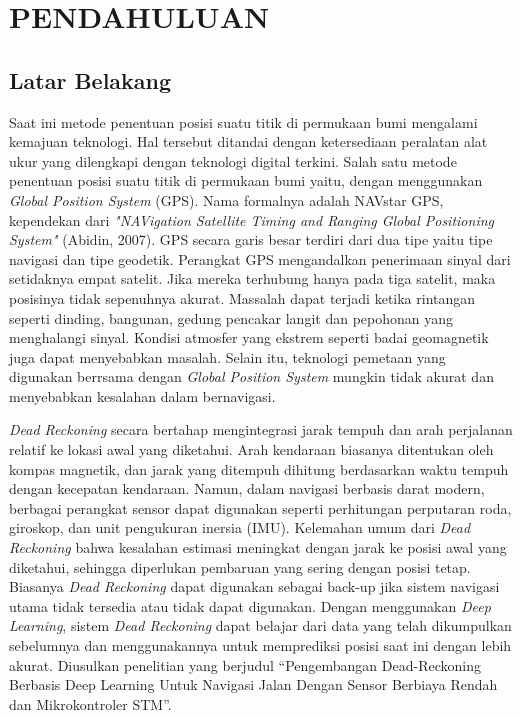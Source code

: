 \chapter{PENDAHULUAN}

\section{Latar Belakang}

Saat ini metode penentuan posisi suatu titik di permukaan bumi mengalami kemajuan teknologi.
Hal tersebut ditandai dengan ketersediaan peralatan alat ukur yang dilengkapi dengan teknologi digital terkini.
Salah satu metode penentuan posisi suatu titik di permukaan bumi yaitu, dengan menggunakan \emph{Global Position System} (GPS).
Nama formalnya adalah NAVstar GPS, kependekan dari \emph{"NAVigation Satellite Timing and Ranging Global Positioning System"} (Abidin, 2007).
GPS secara garis besar terdiri dari dua tipe yaitu tipe navigasi dan tipe geodetik. Perangkat GPS mengandalkan penerimaan sinyal dari setidaknya empat satelit.
Jika mereka terhubung hanya pada tiga satelit, maka posisinya tidak sepenuhnya akurat. 
Massalah dapat terjadi ketika rintangan seperti dinding, bangunan, gedung pencakar langit dan pepohonan yang menghalangi sinyal.
Kondisi atmosfer yang ekstrem seperti badai geomagnetik juga dapat menyebabkan masalah. Selain itu, teknologi pemetaan yang digunakan berrsama dengan \emph{Global Position System}
mungkin tidak akurat dan menyebabkan kesalahan dalam bernavigasi.

\emph{Dead Reckoning} secara bertahap mengintegrasi jarak tempuh dan arah perjalanan relatif ke lokasi awal yang diketahui.
Arah kendaraan biasanya ditentukan oleh kompas magnetik, dan jarak yang ditempuh dihitung berdasarkan waktu tempuh dengan kecepatan kendaraan. 
Namun, dalam navigasi berbasis darat modern, berbagai perangkat sensor dapat digunakan seperti perhitungan perputaran roda, giroskop, dan unit pengukuran inersia (IMU).
Kelemahan umum dari \emph{Dead Reckoning} bahwa kesalahan estimasi meningkat dengan jarak ke posisi awal yang diketahui, sehingga diperlukan pembaruan yang sering dengan posisi tetap.
Biasanya \emph{Dead Reckoning} dapat digunakan sebagai back-up jika sistem navigasi utama tidak tersedia atau tidak dapat digunakan.
Dengan menggunakan \emph{Deep Learning}, sistem \emph{Dead Reckoning} dapat belajar dari data yang telah dikumpulkan sebelumnya dan menggunakannya untuk memprediksi posisi saat ini dengan lebih akurat.
Diusulkan penelitian yang berjudul “Pengembangan Dead-Reckoning Berbasis Deep Learning Untuk Navigasi Jalan Dengan Sensor Berbiaya Rendah dan Mikrokontroler STM”.

